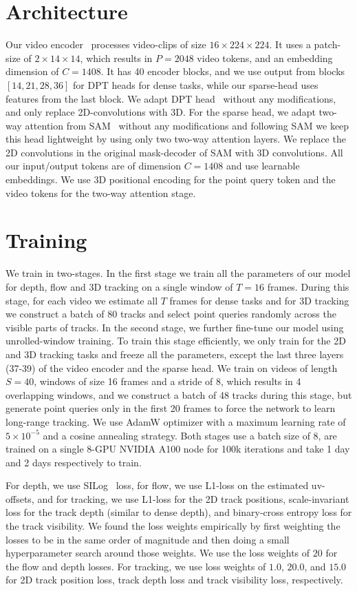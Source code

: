 \section{Architecture}
Our video encoder~\cite{wang2023videomaev2} processes video-clips of size $16 \times 224\times224$.
It uses a patch-size of $2\times14\times14$, which results in $P=2048$ video tokens, and an embedding dimension of $C=1408$.
It has 40 encoder blocks, and we use output from blocks $[14, 21, 28, 36]$ for DPT heads for dense tasks, while our sparse-head uses features from the last block.
We adapt DPT head~\cite{ranftl2021dpt} without any modifications, and only replace 2D-convolutions with 3D.
For the sparse head, we adapt two-way attention from SAM~\cite{kirillov2023SAM} without any modifications and following SAM we keep this head lightweight by using only two two-way attention layers.
We replace the 2D convolutions in the original mask-decoder of SAM with 3D convolutions.
All our input/output tokens are of dimension $C=1408$ and use learnable embeddings.
We use 3D positional encoding for the point query token and the video tokens for the two-way attention stage.


\section{Training}
We train in two-stages. 
In the first stage we train all the parameters of our model for depth, flow and 3D tracking on a single window of $T=16$ frames.
During this stage, for each video we estimate all $T$ frames for dense tasks and for 3D tracking we construct a batch of 80 tracks and select point queries randomly across the visible parts of tracks.
In the second stage, we further fine-tune our model using unrolled-window training.
To train this stage efficiently, we only train for the 2D and 3D tracking tasks and freeze all the parameters, except the last three layers (37-39) of the video encoder and the sparse head.
We train on videos of length $S=40$, windows of size 16 frames and a stride of 8, which results in 4 overlapping windows, and we construct a batch of 48 tracks during this stage, but generate point queries only in the first 20 frames to force the network to learn long-range tracking.
We use AdamW optimizer with a maximum learning rate of $5\times10^{-5}$ and a cosine annealing strategy.
Both stages use a batch size of 8, are trained on a single 8-GPU NVIDIA A100 node for 100k iterations and take 1 day and 2 days respectively to train.

For depth, we use SILog~\cite{eigen2014depth} loss, for flow, we use L1-loss on the estimated uv-offsets, and for tracking, we use L1-loss for the 2D track positions, scale-invariant loss for the track depth (similar to dense depth), and binary-cross entropy loss for the track visibility.
We found the loss weights empirically by first weighting the losses to be in the same order of magnitude and then doing a small hyperparameter search around those weights.
We use the loss weights of $20$ for the flow and depth losses. For tracking, we use loss weights of $1.0$, $20.0$, and $15.0$ for 2D track position loss, track depth loss and track visibility loss, respectively.
